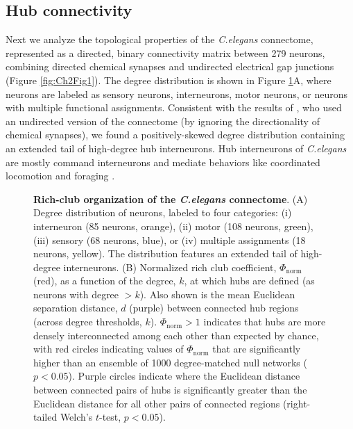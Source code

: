 \subsection{Hub connectivity}

Next we analyze the topological properties of the \emph{C.elegans} connectome, represented as a directed, binary connectivity matrix between 279 neurons, combining directed chemical synapses and undirected electrical gap junctions (Figure \ref{fig:Ch2Fig1}).
The degree distribution is shown in Figure \ref{fig:Ch2Fig5}A, where neurons are labeled as sensory neurons, interneurons, motor neurons, or neurons with multiple functional assignments.
Consistent with the results of \citet{Towlson2013},  who used an undirected version of the connectome (by ignoring the directionality of chemical synapses), we found a positively-skewed degree distribution containing an extended tail of high-degree hub interneurons.
Hub interneurons of \emph{C.elegans} are mostly command interneurons and mediate behaviors like coordinated locomotion and foraging \citep{Tsalik2003}.


\begin{figure}[!h]
 \caption{\textbf{Rich-club organization of the \emph{C.elegans} connectome}.
(A) Degree distribution of neurons, labeled to four categories:
(i) interneuron (85 neurons, orange),
(ii) motor (108 neurons, green),
(iii) sensory (68 neurons, blue), or
(iv) multiple assignments (18 neurons, yellow).
The distribution features an extended tail of high-degree interneurons.
(B)
Normalized rich club coefficient, $\Phi_\mathrm{norm}$ (red), as a function of the degree, $k$, at which hubs are defined (as neurons with degree $>k$).
Also shown is the mean Euclidean separation distance, $d$ (purple) between connected hub regions (across degree thresholds, $k$).
$\Phi_\mathrm{norm} > 1$ indicates that hubs are more densely interconnected among each other than expected by chance, with red circles indicating values of $\Phi_\mathrm{norm}$ that are significantly higher than an ensemble of 1000 degree-matched null networks ($p < 0.05$).
Purple circles indicate where the Euclidean distance between connected pairs of hubs is significantly greater than the Euclidean distance for all other pairs of connected regions (right-tailed Welch's $t$-test, $p < 0.05$).
}
 \label{fig:Ch2Fig5}
\end{figure}

